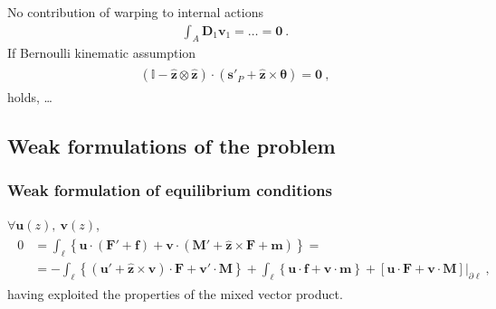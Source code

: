 \documentclass[letterpaper,10pt,english]{jupyterBook}
\begin{document}
\sphinxAtStartPar
No contribution of warping to internal actions
\begin{equation*}
\begin{split}\int_A \mathbf{D}_1 \mathbf{v}_1 = \dots = \mathbf{0} \ .\end{split}
\end{equation*}
\sphinxAtStartPar
{} If Bernoulli kinematic assumption
\begin{equation*}
\begin{split}\begin{aligned}
  \left( \mathbb{I} - \hat{\mathbf{z}} \otimes \hat{\mathbf{z}} \right) \cdot \left( \mathbf{s}'_P + \hat{\mathbf{z}} \times \boldsymbol\theta \right) = \mathbf{0} \ ,
\end{aligned}\end{split}
\end{equation*}
\sphinxAtStartPar
holds, …


\subsection{Weak formulations of the problem}
\label{\detokenize{ch/solids/small-displacements-statics-beams-weak-form-general:weak-formulations-of-the-problem}}\label{\detokenize{ch/solids/small-displacements-statics-beams-weak-form-general:solid-mechanics-intro-small-displacements-statics-beam-weak-form-weak}}

\subsubsection{Weak formulation of equilibrium conditions}
\label{\detokenize{ch/solids/small-displacements-statics-beams-weak-form-general:weak-formulation-of-equilibrium-conditions}}\label{\detokenize{ch/solids/small-displacements-statics-beams-weak-form-general:solid-mechanics-intro-small-displacements-statics-beam-weak-form-weak-equilibrium}}
\sphinxAtStartPar
\(\forall \mathbf{u}(z), \ \mathbf{v}(z)\),
\begin{equation*}
\begin{split}\begin{aligned}
  0 
  & = \int_{\ell} \left\{ \mathbf{u} \cdot \left( \mathbf{F}' + \mathbf{f} \right) + \mathbf{v} \cdot \left( \mathbf{M}' + \hat{\mathbf{z}} \times \mathbf{F} + \mathbf{m} \right) \right\} = \\
  & = - \int_{\ell} \left\{ ( \mathbf{u}' + \hat{\mathbf{z}} \times \mathbf{v} ) \cdot \mathbf{F} + \mathbf{v}' \cdot \mathbf{M} \right\} + \int_{\ell} \left\{  \mathbf{u} \cdot \mathbf{f} + \mathbf{v} \cdot \mathbf{m} \right\} + \left. \left[ \mathbf{u} \cdot \mathbf{F} + \mathbf{v} \cdot \mathbf{M} \right] \right|_{\partial \ell} \ ,
\end{aligned}\end{split}
\end{equation*}
\sphinxAtStartPar
having exploited the properties of the mixed vector product.
\end{document}
